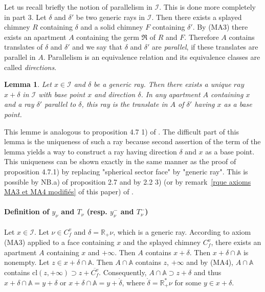 \documentclass[12pt]{article}
\theoremstyle{plain}
\newtheorem{lemme}[thm]{Lemma}
\theoremstyle{definition}
\newcommand{\R}{\mathbb{R}}
\newcommand{\A}{\mathbb{A}}
\newcommand{\I}{\mathcal{I}}
\begin{document}
\vspace{3mm}
Let us recall briefly the notion of parallelism in $\I$. This is done more completely in \cite{rousseau2011masures} part 3. Let $\delta$ and $\delta'$ be two generic rays in $\I$. Then there exists a splayed chimney $R$ containing $\delta$ and a solid chimney $F$ containing $\delta'$. By (MA3) there exists an apartment $A$ containing the germ $\mathfrak{R}$ of $R$ and $F$. Therefore $A$ contains translates of $\delta$ and $\delta'$ and we say that $\delta$ and $\delta'$ are \textit{parallel}, if these translates are parallel in $A$. Parallelism is an equivalence relation and its equivalence classes are called \textit{directions}.

\begin{lemme}\label{lemme demi-droite de base donnée}
Let $x\in \I$ and $\delta$ be a generic ray. Then there exists a unique $ray$ $x+\delta$ in $\I$ with base point $x$ and direction $\delta$. In any apartment $A$ containing $x$ and a ray $\delta'$ parallel to $\delta$, this ray is the translate in $A$ of $\delta'$ having $x$ as a base point.
\end{lemme}

This lemme is analogous to proposition 4.7 1) of \cite{rousseau2011masures}. The difficult part of this lemma is the uniqueness of such a ray because second assertion of the term of the lemma yields a way to construct a ray having direction $\delta$ and $x$ as a base point. This uniqueness can be shown exactly in the same manner as the proof of proposition 4.7.1) by replacing "spherical sector face" by "generic ray". This is possible by NB.a) of proposition 2.7 and by 2.2 3) (or by remark~\ref{rque axioms MA3 et MA4 modifiés} of this paper) of \cite{rousseau2011masures}.


\paragraph{Definition of $y_\nu$ and $T_\nu$ (resp. $y^-_\nu$ and $T^-_\nu$)}
Let $x\in \mathcal{I}$. Let $\nu \in C_f^v$ and $\delta=\R_+\nu$, which is a generic ray. According to axiom (MA3) applied to a face containing $x$ and the splayed chimney $C^v_f$, there exists an apartment $A$ containing $x$ and $+\infty$. Then $A$ contains $x+\delta$. Then $x+\delta\cap \A$ is nonempty. Let $z\in x+\delta\cap \A$. Then $A\cap \A$ contains $z$, $+\infty$ and by (MA4), $A\cap\A$ contains $\mathrm{cl}(z,+\infty)\supset z+\overline{C_f^v}$. Consequently, $A\cap\A \supset z+\delta$ and thus $x+\delta\cap \A=y+\delta$ or $x+\delta\cap \A=y+\mathring{\delta}$, where $\mathring \delta=\R^*_+\nu$ for some $y\in x+\delta$.
\end{document}
